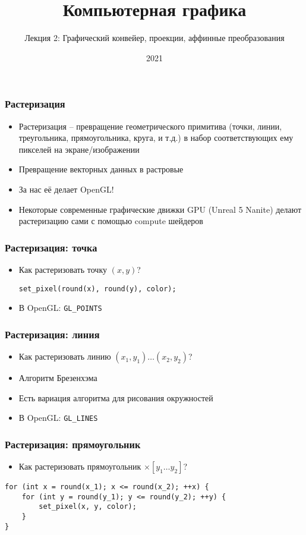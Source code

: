 \documentclass{beamer}
\title{Компьютерная графика}
\subtitle{Лекция 2: Графический конвейер, проекции, аффинные преобразования}
\date{2021}
\begin{document}
\frame{\titlepage}

\begin{frame}
\frametitle{Растеризация}
\begin{itemize}
\item Растеризация -- превращение геометрического примитива (точки, линии, треугольника, прямоугольника, круга, и т.д.) в набор соответствующих ему пикселей на экране/изображении
\item Превращение векторных данных в растровые
\pause
\item За нас её делает OpenGL!
\pause
\item Некоторые современные графические движки GPU (Unreal 5 Nanite) делают растеризацию сами с помощью compute шейдеров
\end{itemize}
\end{frame}

\begin{frame}[fragile]
\frametitle{Растеризация: точка}
\begin{itemize}
\item Как растеризовать точку \begin{math}(x, y)\end{math}?
\pause
\begin{verbatim}
set_pixel(round(x), round(y), color);
\end{verbatim}
\pause
\item В OpenGL: \verb|GL_POINTS|
\end{itemize}
\end{frame}

\begin{frame}[fragile]
\frametitle{Растеризация: линия}
\begin{itemize}
\item Как растеризовать линию \begin{math}(x_1, y_1) \dots (x_2, y_2)\end{math}?
\pause
\item Алгоритм Брезенхэма
\pause
\item Есть вариация алгоритма для рисования окружностей
\pause
\item В OpenGL: \verb|GL_LINES|
\end{itemize}
\end{frame}

\begin{frame}[fragile]
\frametitle{Растеризация: прямоугольник}
\begin{itemize}
\item Как растеризовать прямоугольник \begin{math}[x_1\dots x_2]\times[y_1\dots y_2]\end{math}?
\end{itemize}
\pause
\begin{verbatim}
for (int x = round(x_1); x <= round(x_2); ++x) {
    for (int y = round(y_1); y <= round(y_2); ++y) {
        set_pixel(x, y, color);
    }
}
\end{verbatim}
\end{frame}
\end{document}
